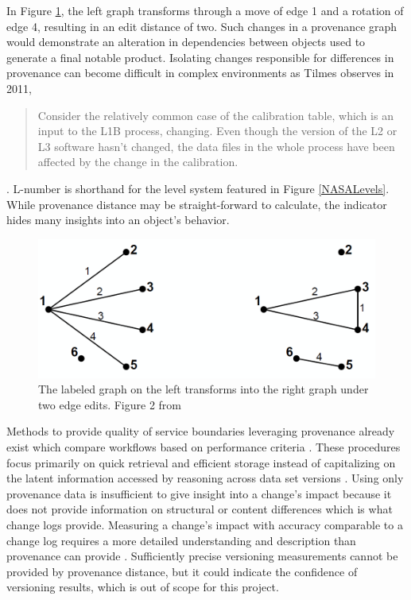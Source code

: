 In Figure \ref{GraphEdit}, the left graph transforms through a move of edge 1 and a rotation of edge 4, resulting in an edit distance of two.
Such changes in a provenance graph would demonstrate an alteration in dependencies between objects used to generate a final notable product.
Isolating changes responsible for differences in provenance can become difficult in complex environments as Tilmes observes in 2011, 
\begin{quotation}
	Consider the relatively common case of the calibration table, which is an input to the L1B process, changing. Even though the version of the L2 or L3 software hasn't changed, the data files in the whole process have been affected by the change in the calibration.
\end{quotation} \cite{TILMES2011548}.
L-number is shorthand for the level system featured in Figure \ref{NASALevels}.
While provenance distance may be straight-forward to calculate, the indicator hides many insights into an object's behavior.

\begin{figure}
	\centering
	\includegraphics[scale=0.40]{figures/GraphEdit.png}
	\caption[The labeled graph on the left transforms into the right graph under two edge edits.]{The labeled graph on the left transforms into the right graph under two edge edits. Figure 2 from \cite{Goddard:1996:DGU:246962.246972}}
	\label{GraphEdit}
\end{figure}

Methods to provide quality of service boundaries leveraging provenance already exist which compare workflows based on performance criteria \cite{2015:CAA:2778374.2778504}.
These procedures focus primarily on quick retrieval and efficient storage instead of capitalizing on the latent information accessed by reasoning across data set versions \cite{tan2004research}.
Using only provenance data is insufficient to give insight into a change's impact because it does not provide information on structural or content differences which is what change logs provide.
Measuring a change's impact with accuracy comparable to a change log requires a more detailed understanding and description than provenance can provide  \cite{Bose:2005:LRS:1057977.1057978}.
Sufficiently precise versioning measurements cannot be provided by provenance distance, but it could indicate the confidence of versioning results, which is out of scope for this project.

